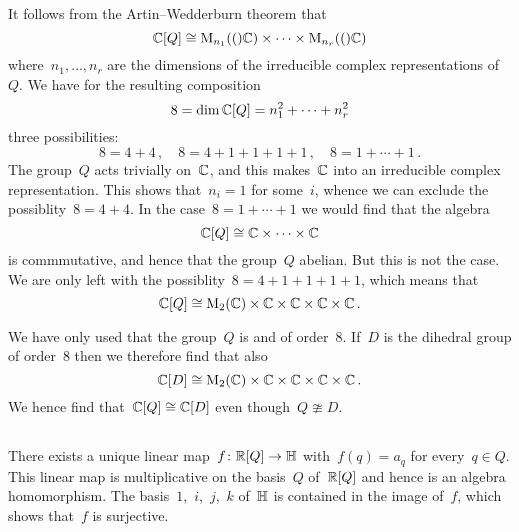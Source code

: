 \section{}





\subsection{}

It follows from the Artin--Wedderburn theorem that
\[
  \mathbb{C}[Q]
  \cong
  \operatorname{M}_{n_1}(()\mathbb{C}) \times \dotsb \times \operatorname{M}_{n_r}(()\mathbb{C})
\]
where~$n_1, \dotsc, n_r$ are the dimensions of the irreducible complex representations of~$Q$.
We have for the resulting composition
\[
  8
  =
  \dim \mathbb{C}[Q]
  =
  n_1^2 + \dotsb + n_r^2
\]
three possibilities:
\[
  8
  =
  4 + 4 \,,
  \quad
  8
  =
  4 + 1 + 1 + 1 + 1 \,,
  \quad
  8
  =
  1 + \dotsb + 1  \,.
\]
The group~$Q$ acts trivially on~$\mathbb{C}$, and this makes~$\mathbb{C}$ into an irreducible complex representation.
This shows that~$n_i = 1$ for some~$i$, whence we can exclude the possiblity~$8 = 4 + 4$.
In the case~$8 = 1 + \dotsb + 1$ we would find that the algebra
\[
  \mathbb{C}[Q]
  \cong
  \mathbb{C}
  \times
  \dotsb
  \times
  \mathbb{C}
\]
is commmutative, and hence that the group~$Q$ abelian.
But this is not the case.
We are only left with the possiblity~$8 = 4 + 1 + 1 + 1 + 1$, which means that
\[
  \mathbb{C}[Q]
  \cong
  \operatorname{M}_{2}(\mathbb{C}) \times \mathbb{C} \times \mathbb{C} \times \mathbb{C} \times \mathbb{C} \,.
\]


\begin{remark}
  We have only used that the group~$Q$ is  and of order~$8$.
  If~$D$ is the dihedral group of order~$8$ then we therefore find that also
  \[
    \mathbb{C}[D]
    \cong
    \operatorname{M}_{2}(\mathbb{C}) \times \mathbb{C} \times \mathbb{C} \times \mathbb{C} \times \mathbb{C} \,.
  \]
  We hence find that~$\mathbb{C}[Q] \cong \mathbb{C}[D]$ even though~$Q \ncong D$.
\end{remark}





\subsection{}


There exists a unique linear map~$f \colon \mathbb{R}[Q] \to \mathbb{H}$ with~$f(q) = a_q$ for every~$q \in Q$.
This linear map is multiplicative on the basis~$Q$ of~$\mathbb{R}[Q]$ and hence is an algebra homomorphism.
The basis~$1$,~$i$,~$j$,~$k$ of~$\mathbb{H}$ is contained in the image of~$f$, which shows that~$f$ is surjective.





